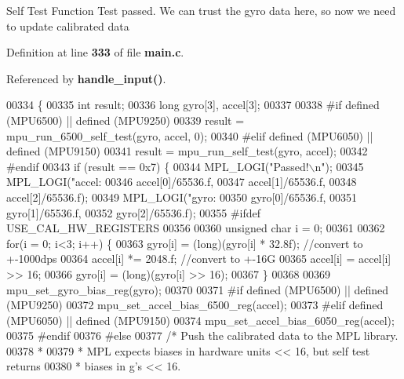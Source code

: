 Self Test Function Test passed. We can trust the gyro data here, so now we need to update calibrated data 

Definition at line \textbf{ 333} of file \textbf{ main.\+c}.



Referenced by \textbf{ handle\+\_\+input()}.


\begin{DoxyCode}
00334 \{
00335     \textcolor{keywordtype}{int} result;
00336     \textcolor{keywordtype}{long} gyro[3], accel[3];
00337 
00338 \textcolor{preprocessor}{#if defined (MPU6500) || defined (MPU9250)}
00339     result = mpu\_run\_6500\_self\_test(gyro, accel, 0);
00340 \textcolor{preprocessor}{#elif defined (MPU6050) || defined (MPU9150)}
00341     result = mpu\_run\_self\_test(gyro, accel);
00342 \textcolor{preprocessor}{#endif}
00343     \textcolor{keywordflow}{if} (result == 0x7) \{
00344     MPL\_LOGI(\textcolor{stringliteral}{"Passed!\(\backslash\)n"});
00345         MPL\_LOGI(\textcolor{stringliteral}{"accel: %
00346                     accel[0]/65536.f,
00347                     accel[1]/65536.f,
00348                     accel[2]/65536.f);
00349         MPL\_LOGI(\textcolor{stringliteral}{"gyro: %
00350                     gyro[0]/65536.f,
00351                     gyro[1]/65536.f,
00352                     gyro[2]/65536.f);
00355 \textcolor{preprocessor}{#ifdef USE\_CAL\_HW\_REGISTERS}
00356 
00360         \textcolor{keywordtype}{unsigned} \textcolor{keywordtype}{char} i = 0;
00361 
00362         \textcolor{keywordflow}{for}(i = 0; i<3; i++) \{
00363             gyro[i] = (long)(gyro[i] * 32.8f); \textcolor{comment}{//convert to +-1000dps}
00364             accel[i] *= 2048.f; \textcolor{comment}{//convert to +-16G}
00365             accel[i] = accel[i] >> 16;
00366             gyro[i] = (long)(gyro[i] >> 16);
00367         \}
00368 
00369         mpu\_set\_gyro\_bias\_reg(gyro);
00370 
00371 \textcolor{preprocessor}{#if defined (MPU6500) || defined (MPU9250)}
00372         mpu\_set\_accel\_bias\_6500\_reg(accel);
00373 \textcolor{preprocessor}{#elif defined (MPU6050) || defined (MPU9150)}
00374         mpu\_set\_accel\_bias\_6050\_reg(accel);
00375 \textcolor{preprocessor}{#endif}
00376 \textcolor{preprocessor}{#else}
00377         \textcolor{comment}{/* Push the calibrated data to the MPL library.}
00378 \textcolor{comment}{         *}
00379 \textcolor{comment}{         * MPL expects biases in hardware units << 16, but self test returns}
00380 \textcolor{comment}{         * biases in g's << 16.}
}}
\end{DoxyCode}
